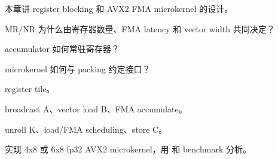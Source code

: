 {本章讲 register blocking 和 AVX2 FMA microkernel 的设计。}
{\item MR/NR 为什么由寄存器数量、FMA latency 和 vector width 共同决定？
\item accumulator 如何常驻寄存器？
\item microkernel 如何与 packing 约定接口？}
{\item register tile。
\item broadcast A、vector load B、FMA accumulate。
\item unroll K、load/FMA scheduling、store C。}
{实现 4x8 或 6x8 fp32 AVX2 microkernel，用  和 benchmark 分析。}
